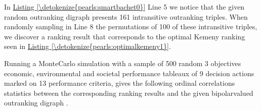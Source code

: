 \documentclass[a4paper,12pt,english]{sphinxhowto}
\begin{document}
\sphinxAtStartPar
In \hyperref[\detokenize{pearls:smartbachet0}]{Listing \ref{\detokenize{pearls:smartbachet0}}} Line 5 we notice that the given random outranking digraph presents 161 intransitive outranking triples. When randomly sampling in Line 8 the permutations of 100 of these intransitive triples, we discover a ranking result that corresponds to the optimal Kemeny ranking seen in \hyperref[\detokenize{pearls:optimalkemeny1}]{Listing \ref{\detokenize{pearls:optimalkemeny1}}}.

\sphinxAtStartPar
Running a MonteCarlo simulation with a sample of 500 random 3 objectives \textendash{}economic, environmental and societal\textendash{} performance tableaux of 9 decision actions marked on 13 performance criteria, gives the following ordinal correlations statistics between the corresponding ranking results and the given bipolar\sphinxhyphen{}valued outranking digraph .
\end{document}
